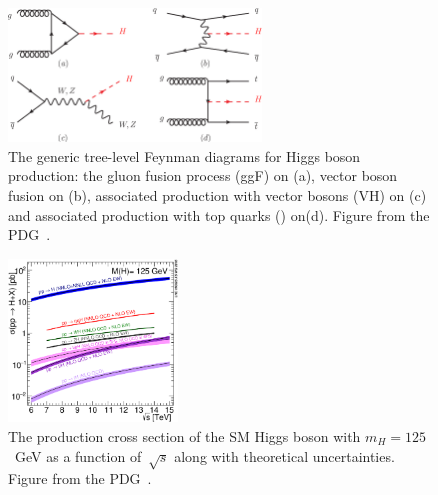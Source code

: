 \begin{figure}
\begin{centering}
\includegraphics[width=0.6\textwidth]{figures/theory/PDG.eps}
\caption[Tree-level Feynman diagrams for Higgs production]{The generic tree-level Feynman diagrams for Higgs boson production: the gluon fusion process (ggF) on (a), vector boson fusion on (b), associated production with vector bosons (VH) on (c) and associated production with top quarks (\ttH) on(d). Figure from the PDG~\cite{Patrignani:2016xqp}.}
\label{fig:higgs_production}
\end{centering}
\end{figure}

\begin{figure}
\begin{centering}
\includegraphics[width=0.4\textwidth]{figures/theory/Higgs_XS_7-14TeV-2016.eps}
\caption[The production cross-section of the Higgs boson]{The production cross section of the SM Higgs boson with $m_H = 125$~GeV as a function of~$\sqrt{s}$ along with theoretical uncertainties. Figure from the PDG~\cite{Patrignani:2016xqp}.}
\label{fig:higgs_xs}
\end{centering}
\end{figure}

